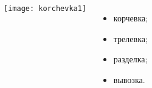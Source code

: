 \begin{columns}
			\centering\texttt{[image: korchevka1]}
			\begin{itemize}
				\item корчевка; 
				\item трелевка;
				\item разделка;
				\item вывозка.
			\end{itemize}
\end{columns}